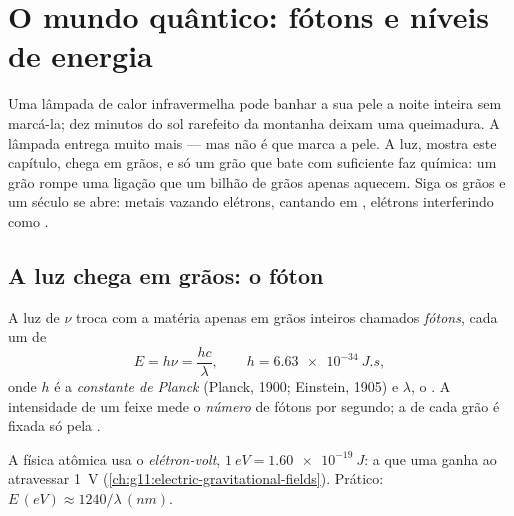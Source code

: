 \chapter{O mundo quântico: fótons e níveis de energia}\label{ch:g12:quantum-world}

Uma lâmpada de calor infravermelha pode banhar a sua pele a noite inteira sem marcá-la;
dez minutos do sol rarefeito da montanha deixam uma queimadura. A lâmpada entrega muito
mais  --- mas não é  que marca a pele. A luz, mostra este capítulo, chega
em grãos, e só um grão que bate com  suficiente faz química: um grão 
rompe uma ligação que um bilhão de grãos  apenas aquecem. Siga os grãos e
um século se abre: metais vazando elétrons,  cantando em ,
elétrons interferindo como .

\section{A luz chega em grãos: o fóton}

\begin{definition}[O fóton]\label{def:g12:quantum-world:photon}
A luz de  $\nu$ troca  com a matéria apenas em grãos inteiros chamados
\emph{fótons}, cada um de 
\[
E = h\nu = \frac{hc}{\lambda}, \qquad h = \qty{6.63e-34}{J.s},
\]
onde $h$ é a \emph{constante de Planck} (Planck, 1900;
Einstein, 1905) e $\lambda$, o . A intensidade de um feixe
mede o \emph{número} de fótons por segundo; a  de cada grão é fixada só pela
.
\end{definition}

\begin{notation}\label{not:g12:quantum-world:ev}
A física atômica usa o \emph{elétron-volt},
$\qty{1}{eV} = \qty{1.60e-19}{J}$: a  que uma  ganha ao atravessar
\qty{1}{V} (\cref{ch:g11:electric-gravitational-fields}). Prático:
$E \,(\unit{eV}) \approx 1240/\lambda\,(\unit{nm})$.
\end{notation}

